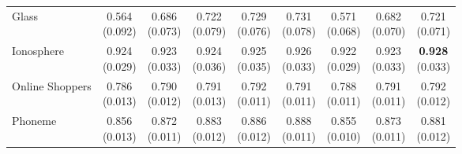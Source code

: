{\begin{longtable}{lcccccccc}
Glass & \makecell{0.564\\{\tiny (0.092)}} & \makecell{0.686\\{\tiny (0.073)}} & \makecell{0.722\\{\tiny (0.079)}} & \makecell{0.729\\{\tiny (0.076)}} & \makecell{0.731\\{\tiny (0.078)}} & \makecell{0.571\\{\tiny (0.068)}} & \makecell{0.682\\{\tiny (0.070)}} & \makecell{0.721\\{\tiny (0.071)}} \\
Ionosphere & \makecell{0.924\\{\tiny (0.029)}} & \makecell{0.923\\{\tiny (0.033)}} & \makecell{0.924\\{\tiny (0.036)}} & \makecell{0.925\\{\tiny (0.035)}} & \makecell{0.926\\{\tiny (0.033)}} & \makecell{0.922\\{\tiny (0.029)}} & \makecell{0.923\\{\tiny (0.033)}} & \makecell{\textbf{0.928}\\{\tiny (0.033)}} \\
Online Shoppers & \makecell{0.786\\{\tiny (0.013)}} & \makecell{0.790\\{\tiny (0.012)}} & \makecell{0.791\\{\tiny (0.013)}} & \makecell{0.792\\{\tiny (0.011)}} & \makecell{0.791\\{\tiny (0.011)}} & \makecell{0.788\\{\tiny (0.011)}} & \makecell{0.791\\{\tiny (0.011)}} & \makecell{0.792\\{\tiny (0.012)}} \\
Phoneme & \makecell{0.856\\{\tiny (0.013)}} & \makecell{0.872\\{\tiny (0.011)}} & \makecell{0.883\\{\tiny (0.012)}} & \makecell{0.886\\{\tiny (0.012)}} & \makecell{0.888\\{\tiny (0.011)}} & \makecell{0.855\\{\tiny (0.010)}} & \makecell{0.873\\{\tiny (0.011)}} & \makecell{0.881\\{\tiny (0.012)}} \\

\end{longtable}}
